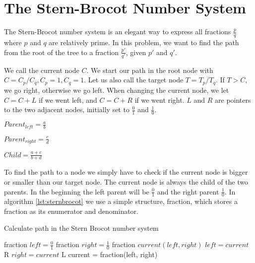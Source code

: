 \documentclass[11pt,a4paper,twoside]{article}
\begin{document}
\section{The Stern-Brocot Number System}

The Stern-Brocot number system is an elegant way to express all fractions
$\frac{p}{q}$ where $p$ and $q$ are relatively prime. In this problem, we want
to find the path from the root of the tree to a fraction $\frac{p'}{q'}$, given
$p'$ and $q'$. 

We call the current node $C$. We start our path in the root node with $C =
C_{p}/C_{q}, C_{p} = 1, C_{q} = 1$. Let us also call the target node $T =
T_{p}/T_{q}$. If $T > C$, we go right, otherwise we go left. When changing the
current node, we let $C = C + L$ if we went left, and $C = C + R$ if we went
right. $L$ and $R$ are pointers to the two adjacent nodes, initially set to
$\frac{0}{1}$ and $\frac{1}{0}$.


$Parent_{left} = \frac{a}{b}$

$Parent_{right} = \frac{c}{d}$

$Child = \frac{a+c}{b+d}$


To find the path to a node we simply have to check if the current node is
bigger or smaller than our target node. The current node is always the child of
the two parents. In the beginning the left parent will be $\frac{0}{1}$ and the
right parent $\frac{1}{0}$. In algorithm \ref{lst:sternbrocot} we use a simple
structure, fraction, which stores a fraction as its enumerator and denominator.

\begin{algorithm}
    \caption{Calculate path in the Stern Brocot number system}
    \label{sternbrocot}
    \begin{algorithmic}
        \STATE fraction $left = \frac{0}{1}$
        \STATE fraction $right = \frac{1}{0}$
        \STATE fraction $current(left, right)$ 
                \STATE $left = current$
                \PRINT R
            \ELSE
                \STATE $right = current$
                \PRINT L
            \ENDIF
            \STATE current = fraction(left, right) 
        \ENDWHILE
    \end{algorithmic}
\end{algorithm}
\end{document}
